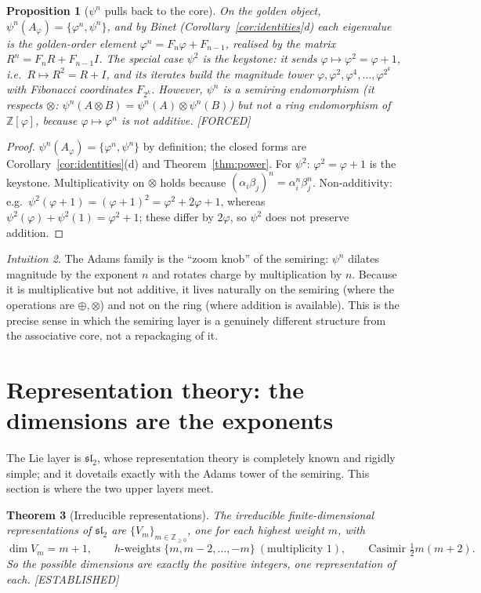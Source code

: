 \documentclass[11pt]{article}
\theoremstyle{plain}
\newtheorem{theorem}{Theorem}[section]
\newtheorem{proposition}[theorem]{Proposition}
\theoremstyle{definition}
\theoremstyle{remark}
\newtheorem{intuition}[theorem]{Intuition}
\newcommand{\Forced}{\textcolor{forcedc}{[FORCED]}}
\newcommand{\Estab}{\textcolor{estabc}{[ESTABLISHED]}}
\begin{document}
\begin{proposition}[$ψ^{n}$ pulls back to the core]\label{prop:adams-core}
On the golden object, $ψ^{n}(A_φ)=\{φ^{n},ψ^{n}\}$, and by Binet (Corollary~\ref{cor:identities}d) each eigenvalue is the golden-order element $φ^{n}=F_nφ+F_{n-1}$, realised by the matrix $R^{n}=F_nR+F_{n-1}I$. The special case $ψ^{2}$ \emph{is the keystone}: it sends $φ↦φ^{2}=φ+1$, i.e.\ $R↦R^{2}=R+I$, and its iterates build the magnitude tower $φ,φ^{2},φ^{4},\dots,φ^{2^{k}}$ with Fibonacci coordinates $F_{2^{k}}$. However, $ψ^{n}$ is a \emph{semiring} endomorphism (it respects $⊗$: $ψ^{n}(A⊗B)=ψ^{n}(A)⊗ψ^{n}(B)$) but \emph{not} a ring endomorphism of $ℤ[φ]$, because $φ↦φ^{n}$ is not additive. \Forced
\end{proposition}
\begin{proof}
$ψ^{n}(A_φ)=\{φ^{n},ψ^{n}\}$ by definition; the closed forms are Corollary~\ref{cor:identities}(d) and Theorem~\ref{thm:power}. For $ψ^{2}$: $φ^{2}=φ+1$ is the keystone. Multiplicativity on $⊗$ holds because $(α_iβ_j)^{n}=α_i^{n}β_j^{n}$. Non-additivity: e.g.\ $ψ^{2}(φ+1)=(φ+1)^{2}=φ^{2}+2φ+1$, whereas $ψ^{2}(φ)+ψ^{2}(1)=φ^{2}+1$; these differ by $2φ$, so $ψ^{2}$ does not preserve addition.
\end{proof}

\begin{intuition}
The Adams family is the ``zoom knob'' of the semiring: $ψ^{n}$ dilates magnitude by the exponent $n$ and rotates charge by multiplication by $n$. Because it is multiplicative but not additive, it lives naturally on the semiring (where the operations are $⊕,⊗$) and not on the ring (where addition is available). This is the precise sense in which the semiring layer is a genuinely different structure from the associative core, not a repackaging of it.
\end{intuition}

\section{Representation theory: the dimensions are the exponents}\label{sec:reps}

The Lie layer is $𝔰𝔩_2$, whose representation theory is completely known and rigidly simple; and it dovetails exactly with the Adams tower of the semiring. This section is where the two upper layers meet.

\begin{theorem}[Irreducible representations]\label{thm:irreps}
The irreducible finite-dimensional representations of $𝔰𝔩_2$ are $\{V_m\}_{m∈ℤ_{≥0}}$, one for each highest weight $m$, with
\[
\dim V_m=m+1,\qquad \text{$h$-weights }\{m,m-2,\dots,-m\}\ (\text{multiplicity }1),\qquad \text{Casimir }\tfrac12 m(m+2).
\]
So the possible dimensions are exactly the positive integers, one representation of each. \Estab
\end{theorem}
\end{document}
